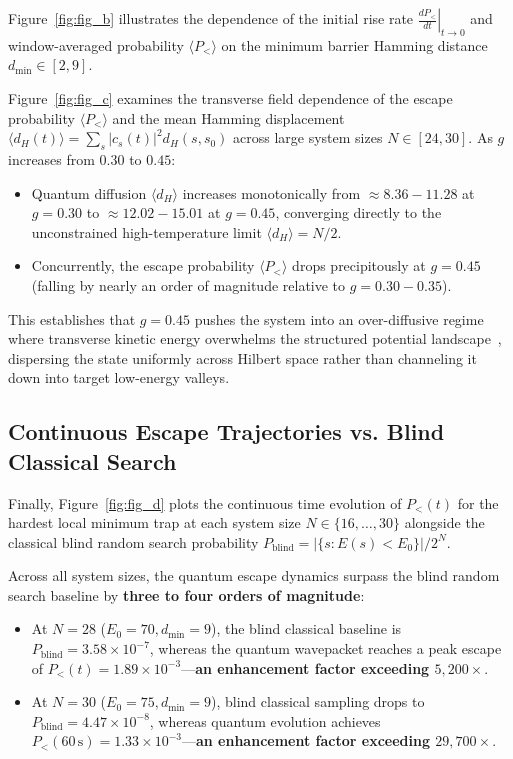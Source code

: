 Figure~\ref{fig:fig_b} illustrates the dependence of the initial rise rate $\left.\frac{dP_<}{dt}\right|_{t\to 0}$ and window-averaged probability $\langle P_< \rangle$ on the minimum barrier Hamming distance $d_{\min} \in [2, 9]$.

Figure~\ref{fig:fig_c} examines the transverse field dependence of the escape probability $\langle P_< \rangle$ and the mean Hamming displacement $\langle d_H(t) \rangle = \sum_s |c_s(t)|^2 d_H(s, s_0)$ across large system sizes $N \in [24, 30]$. As $g$ increases from $0.30$ to $0.45$:
\begin{itemize}
    \item Quantum diffusion $\langle d_H \rangle$ increases monotonically from $\approx 8.36 - 11.28$ at $g = 0.30$ to $\approx 12.02 - 15.01$ at $g = 0.45$, converging directly to the unconstrained high-temperature limit $\langle d_H \rangle = N/2$.
    \item Concurrently, the escape probability $\langle P_< \rangle$ drops precipitously at $g = 0.45$ (falling by nearly an order of magnitude relative to $g = 0.30 - 0.35$). 
\end{itemize}
This establishes that $g = 0.45$ pushes the system into an over-diffusive regime where transverse kinetic energy overwhelms the structured potential landscape~\cite{smelyanskiy2020}, dispersing the state uniformly across Hilbert space rather than channeling it down into target low-energy valleys.

\subsection{Continuous Escape Trajectories vs. Blind Classical Search}
\label{subsec:continuous_dynamics}

Finally, Figure~\ref{fig:fig_d} plots the continuous time evolution of $P_<(t)$ for the hardest local minimum trap at each system size $N \in \{16, \dots, 30\}$ alongside the classical blind random search probability $P_{\text{blind}} = |\{s : E(s) < E_0\}| / 2^N$.

Across all system sizes, the quantum escape dynamics surpass the blind random search baseline by \textbf{three to four orders of magnitude}:
\begin{itemize}
    \item At $N = 28$ ($E_0 = 70, d_{\min} = 9$), the blind classical baseline is $P_{\text{blind}} = 3.58 \times 10^{-7}$, whereas the quantum wavepacket reaches a peak escape of $P_<(t) = 1.89 \times 10^{-3}$---\textbf{an enhancement factor exceeding $5,200\times$}.
    \item At $N = 30$ ($E_0 = 75, d_{\min} = 9$), blind classical sampling drops to $P_{\text{blind}} = 4.47 \times 10^{-8}$, whereas quantum evolution achieves $P_<(60\,\text{s}) = 1.33 \times 10^{-3}$---\textbf{an enhancement factor exceeding $29,700\times$}.
\end{itemize}

